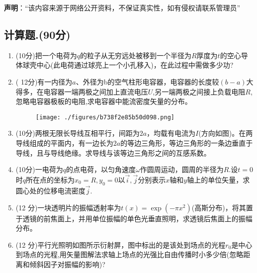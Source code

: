 
\textbf{声明}：“该内容来源于网络公开资料，不保证真实性，如有侵权请联系管理员”

\subsection{计算题.(90分)}
\begin{enumerate}
\item (10分)把一个电荷为$q$的粒子从无穷远处被移到一个半径为$R$厚度为$t$的空心导体球壳中心(此电荷通过球亮上一个小孔移入)，在此过程中需做多少功?
\item ( 12分)有一内径为$a$、外径为b的空气柱形电容器，电容器的长度较$(b-a)$大得多，在电容器一端两极之间加上直流电压$U$,另一端两极之间接上负载电阻$R$,忽略电容器极板的电阻,求电容器中能流密度矢量的分布。
\begin{figure}[ht]
\centering
\texttt{[image: ./figures/b738f2e85b50d098.png]}
\caption{} \label{fig_CD08_1}
\end{figure}
\item (10分)两根无限长导线互相平行，间距为$2a$，均载有电流为$I$(方向如图)。在两导线组成的平面内，有一边长为$2a$的等边三角形，等边三角形的一条边垂直于导线，且与导线绝缘。求导线与该等边三角形之间的互感系数。
\item (10分)一电荷为$q$的点电荷，以匀角速度$\omega$作圆周运动，圆周的半径为$R$.设$t=0$时$q$所在点的坐标为$x_0=R,y_0=0$以$\vec{i},\vec{j}$分别表示$x$轴和$y$轴上的单位矢量，求圆心处的位移电流密度$\vec{j}$.
\item (12 分)一块透明片的振幅透射率为$t(x)=\exp(-\pi x^2)$(高斯分布)，将其置于透镜的前焦面上，并用单位振幅的单色光垂直照明，求透镜后焦面上的振幅分布。
\item (12 分)平行光照明如图所示衍射屏，图中标出的是该处到场点的光程$r_0$是中心到场点的光程,用矢量图解法求轴上场点的光强比自由传播时小多少倍(忽略距离和倾斜因子对振幅的影响)?
\end{enumerate}